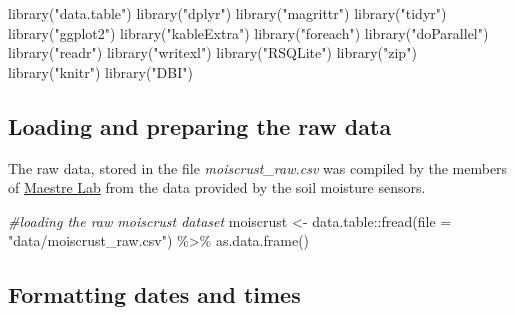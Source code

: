 \documentclass[
  table]{article}
\newenvironment{Shaded}{\begin{snugshade}}{\end{snugshade}}
\newcommand{\AttributeTok}[1]{\textcolor[rgb]{0.77,0.63,0.00}{#1}}
\newcommand{\CommentTok}[1]{\textcolor[rgb]{0.56,0.35,0.01}{\textit{#1}}}
\newcommand{\FunctionTok}[1]{\textcolor[rgb]{0.00,0.00,0.00}{#1}}
\newcommand{\NormalTok}[1]{#1}
\newcommand{\OtherTok}[1]{\textcolor[rgb]{0.56,0.35,0.01}{#1}}
\newcommand{\SpecialCharTok}[1]{\textcolor[rgb]{0.00,0.00,0.00}{#1}}
\newcommand{\StringTok}[1]{\textcolor[rgb]{0.31,0.60,0.02}{#1}}
\begin{document}
\begin{Shaded}
\begin{Highlighting}[]
\FunctionTok{library}\NormalTok{(}\StringTok{"data.table"}\NormalTok{)}
\FunctionTok{library}\NormalTok{(}\StringTok{"dplyr"}\NormalTok{)}
\FunctionTok{library}\NormalTok{(}\StringTok{"magrittr"}\NormalTok{)}
\FunctionTok{library}\NormalTok{(}\StringTok{"tidyr"}\NormalTok{)}
\FunctionTok{library}\NormalTok{(}\StringTok{"ggplot2"}\NormalTok{)}
\FunctionTok{library}\NormalTok{(}\StringTok{"kableExtra"}\NormalTok{)}
\FunctionTok{library}\NormalTok{(}\StringTok{"foreach"}\NormalTok{)}
\FunctionTok{library}\NormalTok{(}\StringTok{"doParallel"}\NormalTok{)}
\FunctionTok{library}\NormalTok{(}\StringTok{"readr"}\NormalTok{)}
\FunctionTok{library}\NormalTok{(}\StringTok{"writexl"}\NormalTok{)}
\FunctionTok{library}\NormalTok{(}\StringTok{"RSQLite"}\NormalTok{)}
\FunctionTok{library}\NormalTok{(}\StringTok{"zip"}\NormalTok{)}
\FunctionTok{library}\NormalTok{(}\StringTok{"knitr"}\NormalTok{)}
\FunctionTok{library}\NormalTok{(}\StringTok{"DBI"}\NormalTok{)}
\end{Highlighting}
\end{Shaded}

\hypertarget{loading-and-preparing-the-raw-data}{%
\subsection{Loading and preparing the raw
data}\label{loading-and-preparing-the-raw-data}}

The raw data, stored in the file \emph{moiscrust\_raw.csv} was compiled
by the members of \href{https://maestrelab.com/en/}{Maestre Lab} from
the data provided by the soil moisture sensors.

\begin{Shaded}
\begin{Highlighting}[]
\CommentTok{\#loading the raw moiscrust dataset}
\NormalTok{moiscrust }\OtherTok{\textless{}{-}}\NormalTok{ data.table}\SpecialCharTok{::}\FunctionTok{fread}\NormalTok{(}\AttributeTok{file =} \StringTok{"data/moiscrust\_raw.csv"}\NormalTok{) }\SpecialCharTok{\%\textgreater{}\%} 
  \FunctionTok{as.data.frame}\NormalTok{()}
\end{Highlighting}
\end{Shaded}

\hypertarget{formatting-dates-and-times}{%
\subsection{Formatting dates and
times}\label{formatting-dates-and-times}}
\end{document}
